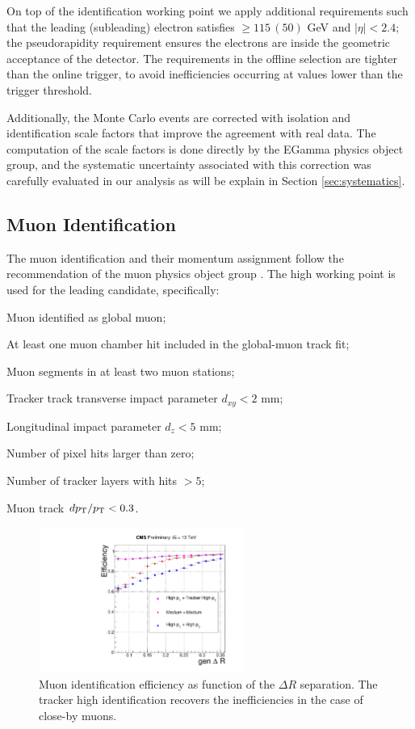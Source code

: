 On top of the identification working point we apply additional requirements such that the leading (subleading) electron satisfies \ptrans  $\geq 115 \, (50)$  GeV and $|\eta| < 2.4$; the pseudorapidity requirement ensures the electrons are inside the geometric acceptance of the detector. The \ptrans requirements in the offline selection are tighter than the online trigger, to avoid inefficiencies occurring at values lower than the trigger threshold.

Additionally, the Monte Carlo events are corrected with isolation and identification scale factors that improve the agreement with real data. The computation of the scale factors is done directly by the EGamma physics object group, and the systematic uncertainty associated with this correction was carefully evaluated in our analysis as will be explain in Section \ref{sec:systematics}.

\subsection*{Muon Identification}
The muon identification and their momentum assignment follow the recommendation of the muon physics object group \cite{muonPOG}. The high \ptrans working point is used for the leading candidate, specifically:
\begin{compact_itemize}
\item Muon identified as global muon;
\item At least one muon chamber hit included in the global-muon track fit;
\item Muon segments in at least two muon stations;
\item Tracker track transverse impact parameter $d_{xy} < 2$ mm;
\item Longitudinal impact parameter $d_z < 5$ mm;
\item Number of pixel hits larger than zero;
\item Number of tracker layers with hits $> 5$;
\item Muon track $dp_{\rm T} / p_{\rm T} < 0.3$.
\end{compact_itemize}

\begin{figure}[!h]
\centering
\includegraphics[width=0.6\textwidth]{figures/objects/id-eff-dR-mu.pdf}
\caption[Muon identification efficiency]{Muon identification efficiency as function of the $\Delta R$ separation. The tracker high \ptrans identification recovers the inefficiencies in the case of close-by muons.}
\label{fig:muid}
\end{figure}

